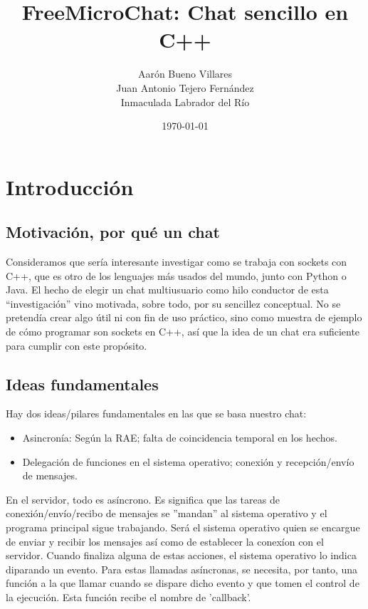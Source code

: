 \documentclass[a4paper,11pt,titlepage,halfparskip,cleardoubleempty]{scrbook}
\title{FreeMicroChat: Chat sencillo en C++}
\author{Aarón Bueno Villares\\Juan Antonio Tejero Fernández\\Inmaculada Labrador del Río}
\date{\today}
\begin{document}
\newcommand{\reduce}{\fontsize{10}{11}\selectfont}
\begin{titlepage}
  \maketitle
\end{titlepage}

\frontmatter
\pagestyle{empty}

\tableofcontents
\listoffigures


\mainmatter
\chapter{Introducción}
\section{Motivación, por qué un chat}

Consideramos que sería interesante investigar como se trabaja con
sockets con C++, que es otro de los lenguajes más usados del mundo,
junto con Python o Java. El hecho de elegir un chat multiusuario como
hilo conductor de esta ``investigación'' vino motivada, sobre todo,
por su sencillez conceptual. No se pretendía crear algo útil ni con
fin de uso práctico, sino como muestra de ejemplo de cómo programar
son sockets en C++, así que la idea de un chat era suficiente para
cumplir con este propósito.


\section{Ideas fundamentales}
Hay dos ideas/pilares fundamentales en las que se basa nuestro chat:\\
\begin{itemize}
\item Asincronía:  Según la RAE; falta de coincidencia temporal en los hechos.
\item Delegación de funciones en el sistema operativo; conexión y recepción/envío de mensajes.
\end{itemize}



   En el servidor, todo es asíncrono. Es significa que las tareas de conexión/envío/recibo de mensajes se ''mandan'' al sistema operativo y el programa principal sigue trabajando. Será el sistema operativo quien se encargue de enviar y recibir los mensajes así como de establecer la conexíon con el servidor. Cuando finaliza alguna de estas acciones, el sistema operativo lo indica diparando un evento. Para estas llamadas asíncronas, se necesita, por tanto, una función a la que llamar cuando se dispare dicho evento y que tomen el control de la ejecución. Esta función recibe el nombre de 'callback'.
\end{document}
